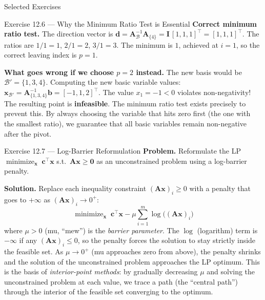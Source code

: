 \documentclass[aspectratio=169,10pt]{beamer}
\DeclareMathOperator*{\minimize}{minimize}
\newcommand{\xv}{\mathbf{x}}
\newcommand{\cv}{\mathbf{c}}
\newcommand{\bv}{\mathbf{b}}
\newcommand{\Av}{\mathbf{A}}
\newcommand{\calB}{\mathcal{B}}
\begin{document}
\begin{frame}[allowframebreaks]{Selected Exercises}
\begin{block}{Exercise 12.6 --- Why the Minimum Ratio Test is Essential}
  \textbf{Correct minimum ratio test.}
  The direction vector is $\mathbf{d} = \Av_\calB^{-1}\Av_{\{4\}} = \mathbf{I}\,[1,1,1]^\top = [1,1,1]^\top$.
  The ratios are $1/1 = 1$, $2/1 = 2$, $3/1 = 3$.  The minimum is $1$, achieved at
  $i = 1$, so the correct leaving index is $p = 1$.

  \textbf{What goes wrong if we choose $p = 2$ instead.}
  The new basis would be $\calB' = \{1,3,4\}$.  Computing the new basic variable
  values: $\xv_{\calB'} = \Av_{\{1,3,4\}}^{-1}\bv = [-1, 1, 2]^\top$.
  The value $x_1 = -1 < 0$ violates non-negativity!  The resulting point is
  \textbf{infeasible}.  The minimum ratio test exists precisely to prevent this.
  By always choosing the variable that hits zero first (the one with the smallest
  ratio), we guarantee that all basic variables remain non-negative after the pivot.
\end{block}

\begin{block}{Exercise 12.7 --- Log-Barrier Reformulation}
  \textbf{Problem.} Reformulate the LP
  $\minimize_\xv\;\cv^\top\xv$ s.t.\ $\Av\xv \ge \mathbf{0}$
  as an unconstrained problem using a log-barrier penalty.

  \textbf{Solution.} Replace each inequality constraint $(\Av\xv)_i \ge 0$ with a
  penalty that goes to $+\infty$ as $(\Av\xv)_i \to 0^+$:
  \[
    \minimize_\xv\;\cv^\top\xv
    - \mu\sum_{i=1}^m \log\!\bigl((\Av\xv)_i\bigr)
  \]
  where $\mu > 0$ (mu, ``mew'') is the \emph{barrier parameter}.
  The $\log$ (logarithm) term is $-\infty$ if any $(\Av\xv)_i \le 0$, so the
  penalty forces the solution to stay strictly inside the feasible set.
  As $\mu \to 0^+$ (mu approaches zero from above), the penalty shrinks and the
  solution of the unconstrained problem approaches the LP optimum.
  This is the basis of \emph{interior-point methods}: by gradually decreasing
  $\mu$ and solving the unconstrained problem at each value, we trace a path
  (the ``central path'') through the interior of the feasible set converging
  to the optimum.
\end{block}

\end{frame}
\end{document}
